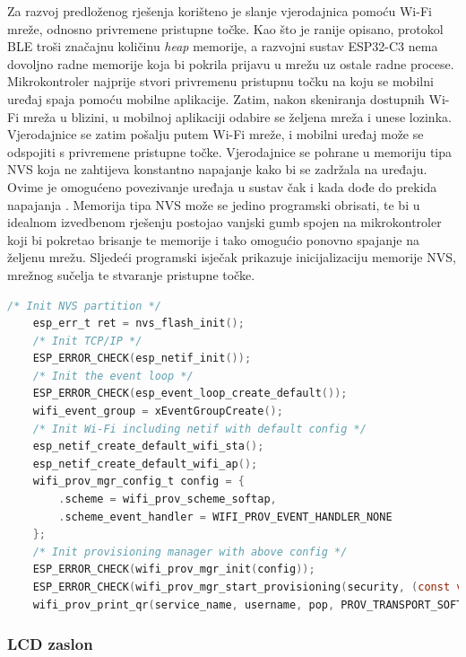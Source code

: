 Za razvoj predloženog rješenja korišteno je slanje vjerodajnica pomoću Wi-Fi mreže, odnosno privremene pristupne točke. Kao što je ranije opisano, protokol BLE troši značajnu količinu \textit{heap} memorije, a razvojni sustav ESP32-C3 nema dovoljno radne memorije koja bi pokrila prijavu u mrežu uz ostale radne procese. Mikrokontroler najprije stvori privremenu pristupnu točku na koju se mobilni uređaj spaja pomoću mobilne aplikacije. Zatim, nakon skeniranja dostupnih Wi-Fi mreža u blizini, u mobilnoj aplikaciji odabire se željena mreža i unese lozinka. Vjerodajnice se zatim pošalju putem Wi-Fi mreže, i mobilni uređaj može se odspojiti s privremene pristupne točke. Vjerodajnice se pohrane u memoriju tipa NVS  koja ne zahtijeva konstantno napajanje kako bi se zadržala na uređaju. Ovime je omogućeno povezivanje uređaja u sustav čak i kada dođe do prekida napajanja \cite{what_is_nvs}. Memorija tipa NVS može se jedino programski obrisati, te bi u idealnom izvedbenom rješenju postojao vanjski gumb spojen na mikrokontroler koji bi pokretao brisanje te memorije i tako omogućio ponovno spajanje na željenu mrežu. Sljedeći programski isječak prikazuje inicijalizaciju memorije NVS, mrežnog sučelja te stvaranje pristupne točke.

\begin{lstlisting}[caption={Stvaranje pristupne točke}, language=c]
	/* Init NVS partition */
	esp_err_t ret = nvs_flash_init();
	/* Init TCP/IP */
	ESP_ERROR_CHECK(esp_netif_init());
	/* Init the event loop */
	ESP_ERROR_CHECK(esp_event_loop_create_default());
	wifi_event_group = xEventGroupCreate();
	/* Init Wi-Fi including netif with default config */
	esp_netif_create_default_wifi_sta();
	esp_netif_create_default_wifi_ap();
	wifi_prov_mgr_config_t config = {
		.scheme = wifi_prov_scheme_softap,
		.scheme_event_handler = WIFI_PROV_EVENT_HANDLER_NONE
	};
    /* Init provisioning manager with above config */
	ESP_ERROR_CHECK(wifi_prov_mgr_init(config));
	ESP_ERROR_CHECK(wifi_prov_mgr_start_provisioning(security, (const void *) sec_params, service_name, service_key));
	wifi_prov_print_qr(service_name, username, pop, PROV_TRANSPORT_SOFTAP, disp);
\end{lstlisting}

\subsubsection{LCD zaslon}


